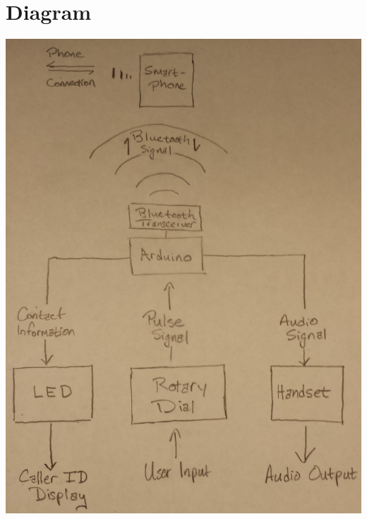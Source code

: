 \documentclass[11pt]{article}
\begin{document}
    \section{Diagram}
        \includegraphics[width=\linewidth,angle=270]{blockdiagram}
\end{document}
